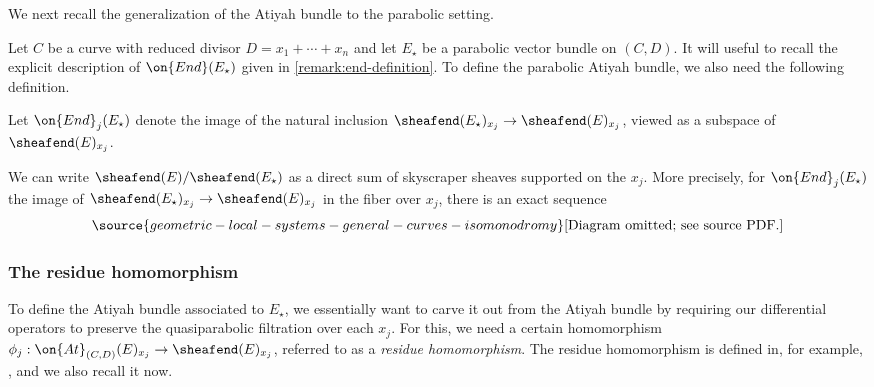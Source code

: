 We next recall the generalization of the Atiyah bundle to the parabolic setting.

	Let $C$ be a curve with reduced divisor $D=x_1+\cdots+x_n$ and let $E_\star$ be a
	parabolic vector bundle on $(C,D)$.
	It will useful to recall the explicit description of $\on{End}(E_\star)$ given in
	\autoref{remark:end-definition}.
	To define the parabolic Atiyah bundle, we also need the following
	definition.

\begin{definition}
\notready
	\label{definition:}
	Let
$\on{End}_j(E_\star)$ denote the image of the natural inclusion
$\sheafend(E_\star)_{x_j} \to \sheafend(E)_{x_j}$, viewed as a subspace of $\sheafend(E)_{x_j}$.
\end{definition}

\begin{remark}
\notready
	\label{remark:}
	We can write $\sheafend(E)/\sheafend(E_\star)$ as a direct sum of skyscraper
sheaves supported on the $x_j$.
More precisely, for $\on{End}_j(E_\star)$ the image of
$\sheafend(E_\star)_{x_j} \to \sheafend(E)_{x_j}$ in the fiber over $x_j$,
there is an exact sequence
\begin{equation}
	\label{equation:}
\source{geometric-local-systems-general-curves-isomonodromy}
	\text{[Diagram omitted; see source PDF.]}\end{equation}
\end{remark}

\subsubsection{The residue homomorphism}
\label{subsubsection:residue}
To define the Atiyah bundle associated to $E_\star$, we essentially want to
carve it out from the Atiyah bundle by requiring our differential operators to preserve the quasiparabolic
filtration over each $x_j$. For this, we need a certain homomorphism
${\phi}_j: \on{At}_{(C,D)}(E)_{x_j}
\to \sheafend(E)_{x_j}$,
referred to as a {\em residue homomorphism}.
The residue homomorphism is
defined in, for
example, \cite[(2.9)]{BHH:parabolic}, and we also recall it now.

